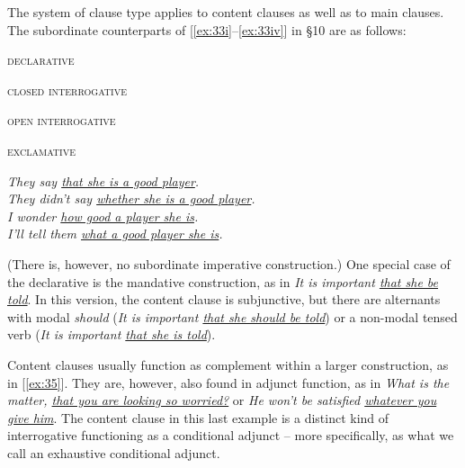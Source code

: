 The system of clause type applies to content clauses as well as to main clauses. The subordinate counterparts of [\ref{ex:33i}--\ref{ex:33iv}] in §10 are as follows:
\begin{examples}
    \item \label{ex:35}
    \begin{minipage}[t]{0.4\linewidth}\vspace{-6pt}
        \begin{examples}
            \item\textsc{declarative}
            \item\textsc{closed interrogative}
            \item\textsc{open interrogative}
            \item\textsc{exclamative}
        \end{examples}
    \end{minipage}
    \begin{minipage}[t]{0.6\linewidth}
        \textit{They say \uline{that she is a good player}.}\\
        \textit{They didn't say \uline{whether she is a good player}.}\\
        \textit{I wonder \uline{how good a player she is}.}\\
        \textit{I'll tell them \uline{what a good player she is}.}
    \end{minipage}
\end{examples}
(There is, however, no subordinate imperative construction.) One special case of the declarative is the {mandative} construction, as in \textit{It is important \uline{that she be told}}. In this version, the content clause is subjunctive, but there are alternants with modal \textit{should} (\textit{It is important \uline{that she should be told}}) or a non-modal tensed verb (\textit{It is important \uline{that she is told}}).

Content clauses usually function as complement within a larger construction, as in [\ref{ex:35}]. They are, however, also found in adjunct function, as in \textit{What is the matter, \uline{that you are looking so worried?}} or \textit{He won't be satisfied \uline{whatever you give him}}. The content clause in this last example is a distinct kind of interrogative functioning as a conditional adjunct -- more specifically, as what we call an {exhaustive conditional adjunct}.

\newpage

